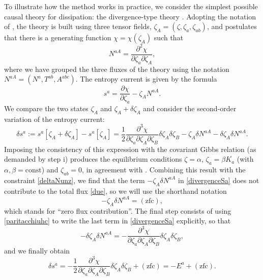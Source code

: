 \documentclass[a4paper, amsfonts, amssymb, amsmath, reprint, showkeys, nofootinbib, twoside, onecolumn,notitlepage]{revtex4-1}
\begin{document}
To illustrate how the method works in practice, we consider the simplest possible causal theory for dissipation: the divergence-type theory \cite{Liu1986}. Adopting the notation of \citet{GerochLindblom1990}, the theory is built using three tensor fields, $\zeta_A = (\zeta,\zeta_a,\zeta_{ab})$, and postulates that there is a generating function $\chi =\chi (\zeta_A)$ such that
\begin{equation}\label{paritacchiuhc}
N^{aA} = \dfrac{\partial^2 \chi}{ \partial \zeta_a \partial \zeta_A} ,
\end{equation}
where we have grouped the three fluxes of the theory using the notation $N^{aA} =(N^a,T^{ab},A^{abc})$. The entropy current is given by the formula
\begin{equation}
s^a = \dfrac{\partial \chi}{\partial \zeta_a } - \zeta_A N^{aA}.
\end{equation}
We compare the two states $\zeta_A$ and $\zeta_A +\delta \zeta_A$ and consider the second-order variation of the entropy current:
\begin{equation}\label{divergenceSa}
 \delta s^a := s^a[\zeta_A+\delta \zeta_A]-s^a[\zeta_A] = \dfrac{1}{2} \dfrac{\partial^3 \chi}{\partial \zeta_a \partial \zeta_A \partial \zeta_B} \delta \zeta_A \delta \zeta_B - \zeta_A \delta N^{aA}- \delta \zeta_A \delta N^{aA}.
\end{equation}
Imposing the consistency of this expression with the covariant Gibbs relation (as demanded by step i) produces the equilibrium conditions $\zeta=\alpha$, $\zeta_a =\beta K_a$ (with $\alpha,\beta=\text{const}$) and $\zeta_{ab}=0$, in agreement with \cite{GerochLindblom1990}. Combining this result with the constraint \eqref{deltaNunz}, we find that the term $- \zeta_A \delta N^{aA}$ in \eqref{divergenceSa} does not contribute to the total flux \eqref{due}, so we will use the shorthand notation
\begin{equation}\label{zNaa}
- \zeta_A \delta N^{aA} =(\text{zfc}),
\end{equation}
which stands for ``zero flux contribution''. The final step consists of using \eqref{paritacchiuhc} to write the last term in \eqref{divergenceSa} explicitly, so that
\begin{equation}
- \delta \zeta_A \delta N^{aA} = - \dfrac{\partial^3 \chi}{ \partial \zeta_a \partial \zeta_A \partial \zeta_B} \delta \zeta_A \delta \zeta_B,
\end{equation}
and we finally obtain
\begin{equation}\label{fourteen}
\delta s^a = -  \dfrac{1}{2} \dfrac{\partial^3 \chi}{\partial \zeta_a \partial \zeta_A \partial \zeta_B} \delta \zeta_A \delta \zeta_B + (\text{zfc}) = -E^a +(\text{zfc}). 
\end{equation}
\end{document}

